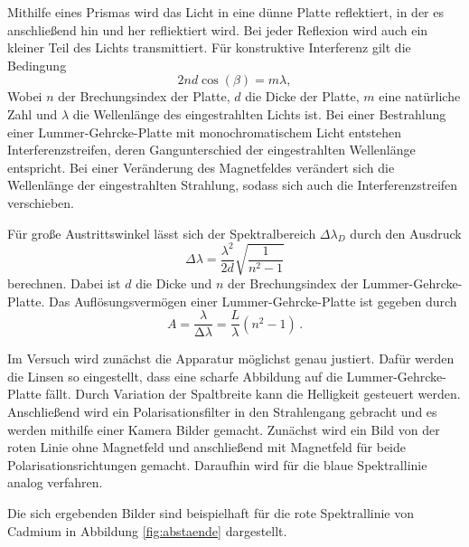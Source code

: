 Mithilfe eines Prismas wird das Licht in eine dünne Platte reflektiert, in der
es anschließend hin und her refliektiert wird. Bei jeder Reflexion wird auch ein kleiner
Teil des Lichts transmittiert. Für konstruktive Interferenz gilt die Bedingung
\begin{equation}
  2n d \cos(\beta)=m \lambda,
\end{equation}
Wobei $n$ der Brechungsindex der Platte, $d$ die Dicke der Platte, $m$ eine natürliche
Zahl und $\lambda$ die Wellenlänge des eingestrahlten Lichts ist. Bei einer Bestrahlung einer
Lummer-Gehrcke-Platte mit monochromatischem Licht entstehen Interferenzstreifen, deren
Gangunterschied der eingestrahlten Wellenlänge entspricht. Bei einer Veränderung
des Magnetfeldes verändert sich die Wellenlänge der eingestrahlten Strahlung, sodass
sich auch die Interferenzstreifen verschieben.

Für große Austrittswinkel lässt sich der Spektralbereich $\Delta \lambda_D$ durch
den Ausdruck
\begin{equation}
   \Delta \lambda = \frac{\lambda^2}{2d} \sqrt{\frac{1}{n^2-1}}
\end{equation}
berechnen. Dabei ist $d$ die Dicke und $n$ der Brechungsindex der Lummer-Gehrcke-Platte.
Das Auflösungsvermögen einer Lummer-Gehrcke-Platte ist gegeben durch
\begin{equation}
  A = \frac{\lambda}{\increment \lambda} = \frac{L}{\lambda}(n^2-1) \,.
\end{equation}

Im Versuch wird zunächst die Apparatur möglichst genau justiert. Dafür werden
die Linsen so eingestellt, dass eine scharfe Abbildung auf die Lummer-Gehrcke-Platte
fällt. Durch Variation der Spaltbreite kann die Helligkeit gesteuert werden.
Anschließend wird ein Polarisationsfilter in den Strahlengang gebracht und es werden
mithilfe einer Kamera Bilder gemacht. Zunächst wird ein Bild von der roten Linie ohne
Magnetfeld und anschließend mit Magnetfeld für beide Polarisationsrichtungen gemacht.
Daraufhin wird für die blaue Spektrallinie analog verfahren.

Die sich ergebenden Bilder sind beispielhaft für die rote Spektrallinie von Cadmium in Abbildung \ref{fig:abstaende} dargestellt.

